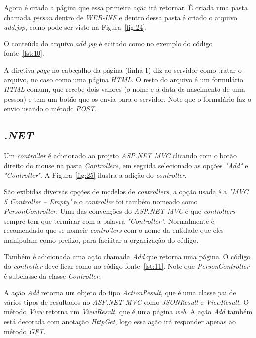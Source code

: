 Agora é criada a página que essa primeira ação irá retornar. É criada uma pasta chamada \textit{person} dentro de \textit{WEB-INF} e dentro dessa pasta é criado o arquivo \textit{add.jsp}, como pode ser visto na Figura~\ref{fig:24}.


O conteúdo do arquivo \textit{add.jsp} é editado como no exemplo do código fonte~\ref{lst:10}.


A diretiva \textit{page} no cabeçalho da página (linha 1) diz ao servidor como tratar o arquivo, no caso como uma página \textit{HTML}. O resto do arquivo é um formulário \textit{HTML} comum, que recebe dois valores (o nome e a data de nascimento de uma pessoa) e tem um botão que os envia para o servidor. Note que o formulário faz o envio usando o método \textit{POST}.

\subsection{\textit{.NET}}

Um \textit{controller} é adicionado ao projeto \textit{ASP.NET MVC} clicando com o botão direito do mouse na pasta \textit{Controllers}, em seguida selecionado as opções \textit{"Add"} e \textit{"Controller"}. A Figura~\ref{fig:25} ilustra a adição do \textit{controller}.


São exibidas diversas opções de modelos de \textit{controllers}, a opção usada é a \textit{"MVC 5 Controller – Empty"} e o \textit{controller} foi também nomeado como \textit{PersonController}. Uma das convenções do \textit{ASP.NET MVC} é que \textit{controllers} sempre tem que terminar com a palavra \textit{"Controller"}. Normalmente é recomendado que se nomeie \textit{controllers} com o nome da entidade que eles manipulam como prefixo, para facilitar a organização do código.

Também é adicionada uma ação chamada \textit{Add} que retorna uma página. O código do \textit{controller} deve ficar como no código fonte~\ref{lst:11}. Note que \textit{PersonController} é subclasse da classe \textit{Controller}.

A ação \textit{Add} retorna um objeto do tipo \textit{ActionResult}, que é uma classe pai de vários tipos de resultados no \textit{ASP.NET MVC} como \textit{JSONResult} e \textit{ViewResult}. O método \textit{View} retorna um \textit{ViewResult}, que é uma página \textit{web}. A ação \textit{Add} também está decorada com anotação \textit{HttpGet}, logo essa ação irá responder apenas ao método \textit{GET}.

